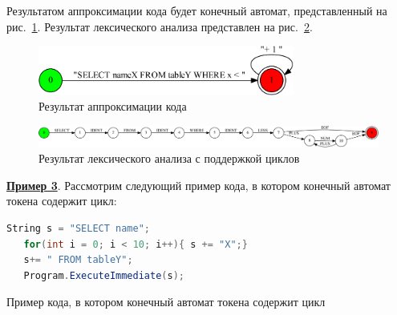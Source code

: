 Результатом аппроксимации кода будет конечный автомат, представленный на рис.~\ref{fig:while_appr}. Результат лексического анализа представлен на рис.~\ref{fig:while_ex}.
\begin{figure}[H]
\begin{center}
\includegraphics[width=0.75\textwidth]{Polubelova/while_appr}
\caption{Результат аппроксимации кода}
\label{fig:while_appr} 
\end{center}
\end{figure}
\begin{figure}[H]
\begin{center}
\includegraphics[width=1.0\textwidth]{Polubelova/WhileEx}
\caption{Результат лексического анализа с поддержкой циклов}
\label{fig:while_ex} 
\end{center}
\end{figure}

\textbf{\underline{Пример 3}}. 
Рассмотрим следующий пример кода, в котором конечный автомат токена содержит цикл:

\begin{listing}[H]
    \begin{lstlisting}[language=csharp]
   String s = "SELECT name";
   for(int i = 0; i < 10; i++){ s += "X";}
   s+= " FROM tableY";
   Program.ExecuteImmediate(s);
    \end{lstlisting}
\caption{Пример кода, в котором конечный автомат токена содержит цикл}
\label{lst:example}
\end{listing}

